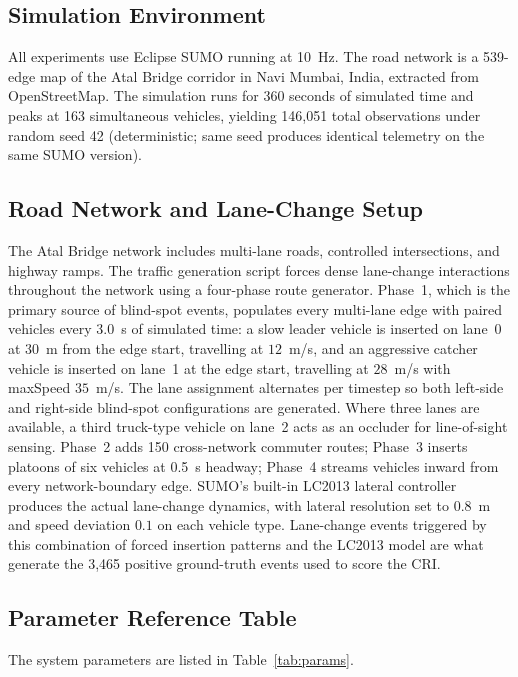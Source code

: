 \documentclass[sn-mathphys-num,Numbered,iicol]{sn-jnl}
\begin{document}
\subsection{Simulation Environment}
All experiments use Eclipse SUMO running at 10~Hz. The road network is a 539-edge map of the Atal Bridge corridor in Navi Mumbai, India, extracted from OpenStreetMap. The simulation runs for 360 seconds of simulated time and peaks at 163 simultaneous vehicles, yielding 146{,}051 total observations under random seed 42 (deterministic; same seed produces identical telemetry on the same SUMO version).

\subsection{Road Network and Lane-Change Setup}\label{sec:lc_setup}
The Atal Bridge network includes multi-lane roads, controlled intersections, and highway ramps. The traffic generation script forces dense lane-change interactions throughout the network using a four-phase route generator. Phase~1, which is the primary source of blind-spot events, populates every multi-lane edge with paired vehicles every 3.0~s of simulated time: a slow leader vehicle is inserted on lane~0 at $30$~m from the edge start, travelling at $12$~m/s, and an aggressive catcher vehicle is inserted on lane~1 at the edge start, travelling at $28$~m/s with maxSpeed $35$~m/s. The lane assignment alternates per timestep so both left-side and right-side blind-spot configurations are generated. Where three lanes are available, a third truck-type vehicle on lane~2 acts as an occluder for line-of-sight sensing. Phase~2 adds 150 cross-network commuter routes; Phase~3 inserts platoons of six vehicles at 0.5~s headway; Phase~4 streams vehicles inward from every network-boundary edge. SUMO's built-in LC2013 lateral controller produces the actual lane-change dynamics, with lateral resolution set to 0.8~m and speed deviation $0.1$ on each vehicle type. Lane-change events triggered by this combination of forced insertion patterns and the LC2013 model are what generate the 3{,}465 positive ground-truth events used to score the CRI.

\subsection{Parameter Reference Table}
The system parameters are listed in Table~\ref{tab:params}.
\end{document}
